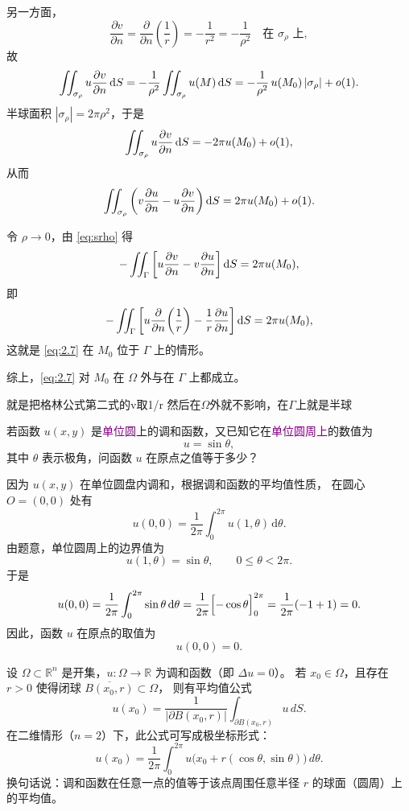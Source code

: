 \begin{solution}
另一方面，
\[
\frac{\partial v}{\partial n}
=\frac{\partial}{\partial n}\!\left(\frac{1}{r}\right)
=-\frac{1}{r^2}=-\frac{1}{\rho^2}
\quad\text{在 }\sigma_\rho \text{ 上},
\]
故
\[
\iint_{\sigma_\rho} u\frac{\partial v}{\partial n}\,{\rm d}S
= -\frac{1}{\rho^2}
  \iint_{\sigma_\rho} u(M)\,{\rm d}S
= -\frac{1}{\rho^2}\,u(M_0)\,|\sigma_\rho|+o(1).
\]
半球面积 $|\sigma_\rho|=2\pi\rho^2$，于是
\[
\iint_{\sigma_\rho} u\frac{\partial v}{\partial n}\,{\rm d}S
= -2\pi u(M_0)+o(1),
\]
从而
\[
\iint_{\sigma_\rho}
\left(
  v\frac{\partial u}{\partial n}
  -u\frac{\partial v}{\partial n}
\right){\rm d}S
= 2\pi u(M_0)+o(1).
\]

令 $\rho\to0$，由 \eqref{eq:srho} 得
\[
 -\iint_{\Gamma}
 \left[
   u\frac{\partial v}{\partial n}
   -v\frac{\partial u}{\partial n}
 \right]{\rm d}S
 =2\pi u(M_0),
\]
即
\[
 -\iint_{\Gamma}
 \left[
   u\frac{\partial}{\partial n}\!\left(\frac{1}{r}\right)
   -\frac{1}{r}\frac{\partial u}{\partial n}
 \right]{\rm d}S
 =2\pi u(M_0),
\]
这就是 \eqref{eq:2.7} 在 $M_0$ 位于 $\Gamma$ 上的情形。

综上，\eqref{eq:2.7} 对 $M_0$ 在 $\Omega$ 外与在 $\Gamma$ 上都成立。
\end{solution}
\begin{dxtips}
    就是把格林公式第二式的v取1/r 然后在$\Omega $外就不影响，在$\Gamma$上就是半球
\end{dxtips}
\begin{homework}[2]
若函数 $u(x,y)$ 是\textcolor{purple}{单位圆}上的调和函数，又已知它在\textcolor{purple}{单位圆周上}的数值为
\[
u = \sin\theta,
\]
其中 $\theta$ 表示极角，问函数 $u$ 在原点之值等于多少？
\end{homework}
\begin{solution}
因为 $u(x,y)$ 在单位圆盘内调和，根据调和函数的平均值性质，
在圆心 $O=(0,0)$ 处有
\[
u(0,0)
= \frac{1}{2\pi}\int_{0}^{2\pi} u(1,\theta)\,\mathrm d\theta .
\]
由题意，单位圆周上的边界值为
\[
u(1,\theta)=\sin\theta,\qquad 0\le\theta<2\pi.
\]
于是
\[
u(0,0)
= \frac{1}{2\pi}\int_{0}^{2\pi}\sin\theta\,\mathrm d\theta
= \frac{1}{2\pi}\Bigl[-\cos\theta\Bigr]_{0}^{2\pi}
= \frac{1}{2\pi}(-1+1)=0.
\]
因此，函数 $u$ 在原点的取值为
\[
u(0,0)=0.
\]
\end{solution}
\begin{theorem}[调和函数的平均值性质]
设 $\Omega\subset\mathbb{R}^n$ 是开集，$u:\Omega\to\mathbb{R}$ 为调和函数（即 $\Delta u = 0$）。
若 $x_0\in\Omega$，且存在 $r>0$ 使得闭球 $\overline{B(x_0,r)}\subset\Omega$，
则有平均值公式
\[
u(x_0)
=\frac{1}{|\partial B(x_0,r)|}
\int_{\partial B(x_0,r)} u\, dS .
\]
在二维情形（$n=2$）下，此公式可写成极坐标形式：
\[
u(x_0)
=
\frac{1}{2\pi}
\int_{0}^{2\pi}
u\!\bigl(x_0+r(\cos\theta,\sin\theta)\bigr)\, d\theta .
\]
换句话说：调和函数在任意一点的值等于该点周围任意半径 $r$ 的球面（圆周）上的平均值。
\end{theorem}
